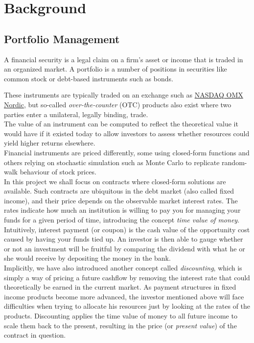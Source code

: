 \chapter{Background}

\section{Portfolio Management}

A financial security is a legal claim on a firm's asset or income 
that is traded in an organized market\cite{alexander2008market}.
A portfolio is a number of positions in securities like common
stock or debt-based instruments such as bonds.

These instruments are typically traded on an exchange such as 
\href{http://www.nasdaqomxnordic.com/}{NASDAQ OMX Nordic}, but so-called
\emph{over-the-counter} (OTC) products also exist where two parties enter
a unilateral, legally binding, trade.\\
The value of an instrument can be computed to reflect the theoretical 
value it would have if it existed today to allow investors to assess
whether resources could yield higher returns elsewhere.\\

Financial instruments are priced differently, some using closed-form functions
and others relying on stochastic simulation such as Monte Carlo to replicate 
random-walk behaviour of stock prices\cite{HULL}.\\

In this project we shall focus on contracts where closed-form solutions are
available. Such contracts are ubiquitous in the debt market (also called fixed
income), and their price depends on the observable market interest
rates. The rates indicate how much an institution is willing to pay you for
managing your funds for a given period of time, introducing the concept
\emph{time value of money}. Intuitively, interest payment (or coupon) is
the cash value of the opportunity cost caused by having your funds tied up.
An investor is then able to gauge whether or not an investment will be
fruitful by comparing the dividend with what he or she would receive by 
depositing the money in the bank.\\

Implicitly, we have also introduced another concept called \emph{discounting},
which is simply a way of pricing a future cashflow by removing the interest
rate that could theoretically be earned in the current market. As payment structures
in fixed income products become more advanced, the investor mentioned above will 
face difficulties when trying to allocate his resources just by looking at the
rates of the products. Discounting applies the time value of money to all
future income to scale them back to the present, resulting in the price (or
\emph{present value}) of the contract in question.\\

